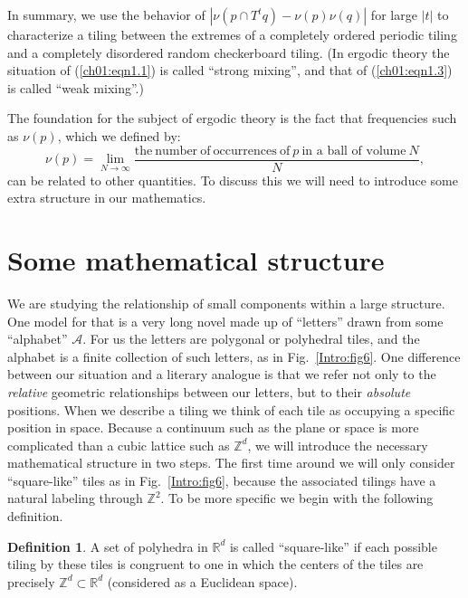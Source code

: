 \documentclass[reqno]{stml-l}
\theoremstyle{plain}
\theoremstyle{definition}
\newtheorem{definition}[theorem]{Definition}
\numberwithin{equation}{chapter}
\begin{document}
In summary, we use the behavior of $|\nu(p\cap T^{t}q)-\nu(p)\nu(q)|$ for large $|t|$ to characterize a tiling between the extremes of a completely ordered periodic tiling and a completely disordered random checkerboard tiling. (In ergodic theory the situation of (\ref{ch01:eqn1.1}) is called ``strong mixing'', and that of (\ref{ch01:eqn1.3}) is called ``weak mixing''.)

The foundation for the subject of ergodic theory is the fact that frequencies such as $\nu(p)$, which we defined by:
\begin{equation}
\nu(p)=\lim\limits_{N\rightarrow\infty}\frac{\mathrm{the\ number\ of\ occurrences\
of}\ p\ \mbox{in a ball of volume}\ N} {N}, \label{ch01:eqn1.4}
\end{equation}
can be related to other quantities. To discuss this we will need to introduce some extra structure in our mathematics.

\section{Some mathematical structure}\label{ch01:sec2}

We are studying the relationship of small components within a large structure. One model for that is a very long novel made up of ``letters'' drawn from some ``alphabet'' $\mathcal{A}$. For us the letters are polygonal or polyhedral tiles, and the alphabet is a finite collection of such letters, as in Fig.~\ref{Intro:fig6}. One difference between our situation and a literary analogue is that we refer not only to the \emph{relative} geometric relationships between our letters, but to their \emph{absolute} positions. When we describe a tiling we think of each tile as occupying a specific position in space. Because a continuum such as the plane or space is more complicated than a cubic lattice such as $\mathbb{Z}^{d}$, we will introduce the necessary mathematical structure in two steps. The first time around we will only consider ``square-like'' tiles as in Fig.~\ref{Intro:fig6}, because the associated tilings have a natural labeling through $\mathbb{Z}^{2}$. To be more specific we begin with the following definition.

\begin{definition}\label{ch01:def1.1}
A set of polyhedra in $\mathbb{R}^{d}$ is called ``square-like'' if each possible tiling by these tiles is congruent to one in which the centers of the tiles are precisely $\mathbb{Z}^{d}\subset \mathbb{R}^{d}$ (considered as a Euclidean space).
\end{definition}
\end{document}
